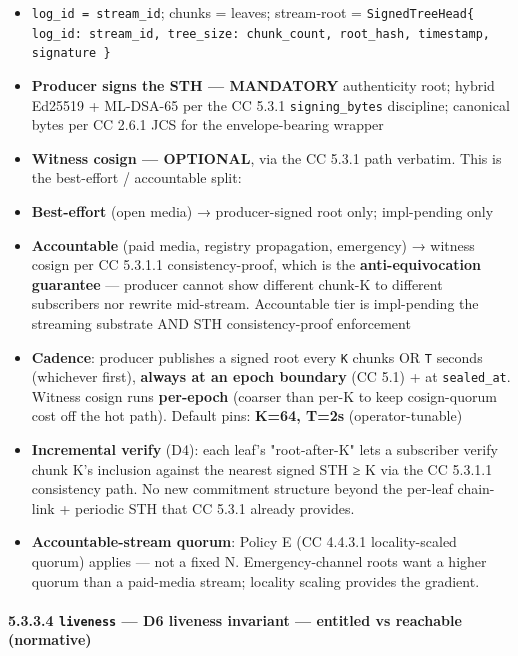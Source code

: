 \documentclass[11pt]{article}
\begin{document}
\begin{itemize}\setlength\itemsep{0pt}
\item \texttt{log\_id = stream\_id}; chunks = leaves; stream-root = \texttt{SignedTreeHead\{ log\_id: stream\_id, tree\_size: chunk\_count, root\_hash, timestamp, signature \}}
\item \textbf{Producer signs the STH — MANDATORY} authenticity root; hybrid Ed25519 + ML-DSA-65 per the CC 5.3.1 \texttt{signing\_bytes} discipline; canonical bytes per CC 2.6.1 JCS for the envelope-bearing wrapper
\item \textbf{Witness cosign — OPTIONAL}, via the CC 5.3.1 path verbatim. This is the best-effort / accountable split:
\item \textbf{Best-effort} (open media) → producer-signed root only; impl-pending only
\item \textbf{Accountable} (paid media, registry propagation, emergency) → witness cosign per CC 5.3.1.1 consistency-proof, which is the \textbf{anti-equivocation guarantee} — producer cannot show different chunk-K to different subscribers nor rewrite mid-stream. Accountable tier is impl-pending the streaming substrate AND STH consistency-proof enforcement
\item \textbf{Cadence}: producer publishes a signed root every \texttt{K} chunks OR \texttt{T} seconds (whichever first), \textbf{always at an epoch boundary} (CC 5.1) + at \texttt{sealed\_at}. Witness cosign runs \textbf{per-epoch} (coarser than per-K to keep cosign-quorum cost off the hot path). Default pins: \textbf{K=64, T=2s} (operator-tunable)
\item \textbf{Incremental verify} (D4): each leaf's "root-after-K" lets a subscriber verify chunk K's inclusion against the nearest signed STH ≥ K via the CC 5.3.1.1 consistency path. No new commitment structure beyond the per-leaf chain-link + periodic STH that CC 5.3.1 already provides.
\item \textbf{Accountable-stream quorum}: Policy E (CC 4.4.3.1 locality-scaled quorum) applies — not a fixed N. Emergency-channel roots want a higher quorum than a paid-media stream; locality scaling provides the gradient.
\end{itemize}


\paragraph{5.3.3.4 \texttt{liveness} — D6 liveness invariant — entitled vs reachable (normative)}\mbox{}\\
\end{document}
